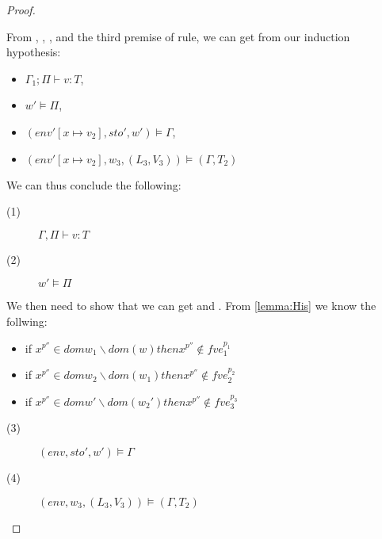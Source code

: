 \documentclass[../../master.tex]{subfiles}
\begin{document}
\begin{proof}
\begin{description}
			From , , , and the third premise of  rule, we can get from our induction hypothesis:
			\begin{itemize}
				\item $\Gamma_1;\Pi\vdash v:T$,
				\item $w'\models\Pi$,
				\item $(env'[x\mapsto v_2],sto',w')\models\Gamma$,
				\item $(env'[x\mapsto v_2],w_3,(L_3,V_3))\models(\Gamma,T_2)$
			\end{itemize}
			We can thus conclude the following:
			\begin{description}
				\item[(1)] $\Gamma,\Pi\vdash v:T$
				\item[(2)] $w'\models\Pi$
			\end{description}

			We then need to show that we can get  and .
			From \cref{lemma:His} we know the follwing:
			\begin{itemize}
				\item if $x^{p''}\in dom{w_1}\backslash dom(w) then x^{p''}\notin fv{e_1^{p_1}}$
				\item if $x^{p''}\in dom{w_2}\backslash dom(w_1) then x^{p''}\notin fv{e_2^{p_2}}$
				\item if $x^{p''}\in dom{w'}\backslash dom(w_2') then x^{p''}\notin fv{e_3^{p_3}}$
			\end{itemize}
			\begin{description}
				\item[(3)] $(env,sto',w')\models\Gamma$
				\item[(4)] $(env,w_3,(L_3,V_3))\models(\Gamma,T_2)$
			\end{description}


\end{description}
\end{proof}
\end{document}
